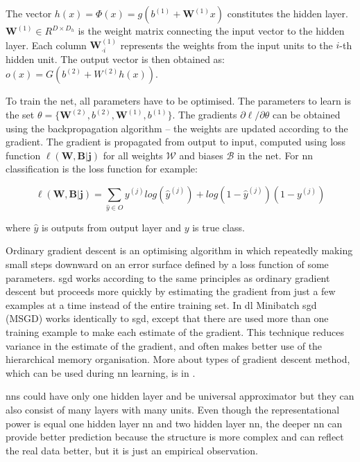 \documentclass[thesis=M,english]{FITthesis}[2012/10/20]
\begin{document}
The vector $h(x) = \Phi(x) = g(b^{(1)} + \mathbf{W}^{(1)} x)$ constitutes the hidden layer. $\mathbf{W}^{(1)} \in R^{D \times D_h}$ is the weight matrix connecting the input vector to the hidden layer. Each column $\mathbf{W}^{(1)}_{\cdot i}$ represents the weights from the input units to the $i$-th hidden unit. The output vector is then obtained as: $o(x) = G(b^{(2)} + W^{(2)} h(x))$.\cite{theano_mlp} 

To train the net, all parameters have to be optimised. The parameters to learn is the set $\theta = \{\mathbf{W}^{(2)},b^{(2)},\mathbf{W}^{(1)},b^{(1)}\}$. The gradients $\partial{\ell}/\partial{\theta}$ can be obtained using the backpropagation algorithm\cite{theano_mlp} -- the weights are updated according to the gradient. The gradient is propagated from output to input, computed using loss function $\ell(\mathbf{W, B|j})$ for all weights $\mathcal{W}$ and biases $\mathcal{B}$ in the net. For \gls{nn} classification is the loss function for example:

\begin{equation}
\ell(\mathbf{W, B|j}) = \sum_{\hat{y} \in O}{y^{(j)} log{(\hat{y}^{(j)})} + log{(1-\hat{y}^{(j)})}(1-y^{(j)})}
\end{equation}

\noindent where $\hat{y}$ is outputs from output layer and $y$ is true class.

Ordinary gradient descent is an optimising algorithm in which repeatedly making small steps downward on an error surface defined by a loss function of some parameters. \gls{sgd} works according to the same principles as ordinary gradient descent but proceeds more quickly by estimating the gradient from just a few examples at a time instead of the entire training set. In \gls{dl} Minibatch \gls{sgd} (MSGD) works identically to \gls{sgd}, except that there are used more than one training example to make each estimate of the gradient. This technique reduces variance in the estimate of the gradient, and often makes better use of the hierarchical memory organisation.\cite{theano_sgd} More about types of gradient descent method, which can be used during \gls{nn} learning, is in \cite{Qian1999sgd}.

\gls{nn}s could have only one hidden layer and be universal approximator \cite{Cybenko1989ann_aproximate} but they can also consist of many layers with many units. Even though the representational power is equal one hidden layer \gls{nn} and two hidden layer \gls{nn}, the deeper \gls{nn} can provide better prediction because the structure is more complex and can reflect the real data better, but it is just an empirical observation.\cite{Johnson2017ann_intro}
\end{document}
